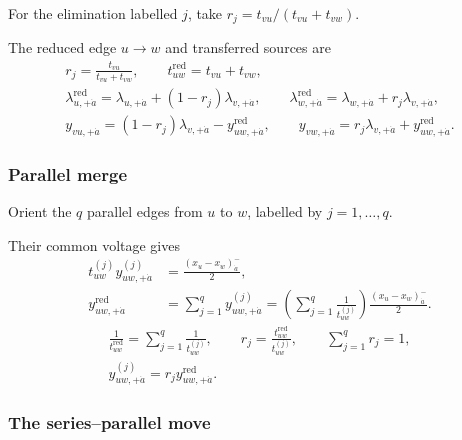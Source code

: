 \documentclass[11pt]{article}
\numberwithin{equation}{section}
\numberwithin{figure}{section}
\numberwithin{table}{section}
\begin{document}
For the elimination labelled $j$, take $r_j=t_{vu}/(t_{vu}+t_{vw})$.

The reduced edge $u\to w$ and transferred sources are
\begin{equation}\label{eq-1-64}
\begin{gathered}
r_j=\frac{t_{vu}}{t_{vu}+t_{vw}},\qquad
t_{uw}^{\mathrm{red}}=t_{vu}+t_{vw},\\
\lambda_{u,+\dot a}^{\mathrm{red}}
=\lambda_{u,+\dot a}+(1-r_j)\lambda_{v,+\dot a},\qquad
\lambda_{w,+\dot a}^{\mathrm{red}}
=\lambda_{w,+\dot a}+r_j\lambda_{v,+\dot a},\\
y_{vu,+\dot a}=(1-r_j)\lambda_{v,+\dot a}-y_{uw,+\dot a}^{\mathrm{red}},\qquad
y_{vw,+\dot a}=r_j\lambda_{v,+\dot a}+y_{uw,+\dot a}^{\mathrm{red}}.
\end{gathered}
\end{equation}

\subsubsection{Parallel merge}\label{local-B-parallel-heading}

Orient the $q$ parallel edges from $u$ to $w$, labelled by $j=1,\ldots,q$.

Their common voltage gives
\begin{equation}\label{eq-B-parallel-derivation}
\begin{aligned}
t_{uw}^{(j)}y_{uw,+\dot a}^{(j)}
&=\frac{(x_u-x_w)^-_{\dot a}}2,\\
y_{uw,+\dot a}^{\mathrm{red}}
&=\sum_{j=1}^q y_{uw,+\dot a}^{(j)}
=\left(\sum_{j=1}^q\frac1{t_{uw}^{(j)}}\right)
\frac{(x_u-x_w)^-_{\dot a}}2.
\end{aligned}
\end{equation}
\begin{equation}\label{eq-1-63}
\begin{gathered}
\frac1{t_{uw}^{\mathrm{red}}}=\sum_{j=1}^q\frac1{t_{uw}^{(j)}},\qquad
r_j=\frac{t_{uw}^{\mathrm{red}}}{t_{uw}^{(j)}},\qquad\sum_{j=1}^q r_j=1,\\
y_{uw,+\dot a}^{(j)}=r_jy_{uw,+\dot a}^{\mathrm{red}}.
\end{gathered}
\end{equation}

\subsubsection{The series--parallel move}\label{sec-B-kernel-recursion}
\end{document}
